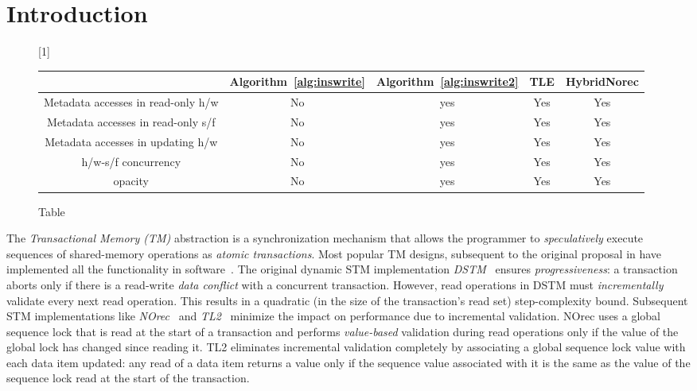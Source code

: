 \section{Introduction}
\label{sec:intro}
%
\begin{figure*}[!ht]
      
     \scalebox{1}[1]{
     \begin{tabularx}{\textwidth}{c|c|c|c|c}
	~~~~~ & Algorithm~\ref{alg:inswrite} & Algorithm~\ref{alg:inswrite2} & TLE & HybridNorec\\ \hline
	Metadata accesses in read-only h/w & No & yes & Yes & Yes \\ \hline
	Metadata accesses in read-only s/f & No & yes & Yes & Yes \\ \hline
	Metadata accesses in updating h/w & No & yes & Yes & Yes \\ \hline
	h/w-s/f concurrency & No & yes & Yes & Yes \\ \hline
	opacity & No & yes & Yes & Yes \\  \hline
   \end{tabularx}
\caption{Table}\label{fig:main}    
}
\end{figure*}
%
The \emph{Transactional Memory (TM)} abstraction is a synchronization mechanism 
that allows the programmer to \emph{speculatively} execute sequences of shared-memory
operations as \emph{atomic transactions}.
Most popular TM designs, subsequent to the original proposal in \cite{HM93} 
have implemented all the functionality in software~\cite{norec, ST95,HLM+03, astm, fraser}.
The original dynamic STM implementation \emph{DSTM}~\cite{HLM+03} ensures \emph{progressiveness}: 
a transaction aborts only if there is a read-write \emph{data conflict} with a concurrent
transaction. However, read operations in DSTM must \emph{incrementally} validate
every next read operation. This results in a quadratic  (in the size of the transaction's read
set) step-complexity bound. Subsequent STM 
implementations like \emph{NOrec}~\cite{norec} and \emph{TL2}~\cite{DSS06}
minimize the impact on performance due to incremental validation.
NOrec uses a global sequence lock that is read at the start of a transaction and performs \emph{value-based}
validation during read operations only if the value of the global lock has changed since reading it.
TL2 eliminates incremental validation completely by associating a global sequence lock
value with each data item updated: any read of a data item returns
a value only if the sequence value associated with it is the same as the 
value of the sequence lock read at the start of the transaction. 


